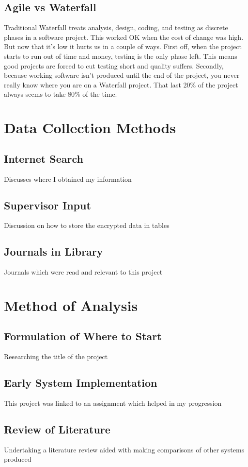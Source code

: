 \subsection{Agile vs Waterfall}
Traditional Waterfall treats analysis, design, coding, and testing as discrete phases in a software project. This worked OK when the cost of change was high. But now that it's low it hurts us in a couple of ways. First off, when the project starts to run out of time and money, testing is the only phase left. This means good projects are forced to cut testing short and quality suffers. Secondly, because working software isn't produced until the end of the project, you never really know where you are on a Waterfall project. That last 20\% of the project always seems to take 80\% of the time.

\section{Data Collection Methods}

\subsection{Internet Search}
Discusses where I obtained my information
\subsection{Supervisor Input}
Discussion on how to store the encrypted data in tables 
\subsection{Journals in Library}
Journals which were read and relevant to this project


\section{Method of Analysis}

\subsection{Formulation of Where to Start}
Researching the title of the project
\subsection{Early System Implementation}
This project was linked to an assignment which helped in my progression
\subsection{Review of Literature}
Undertaking a literature review aided with making comparisons of other systems produced


